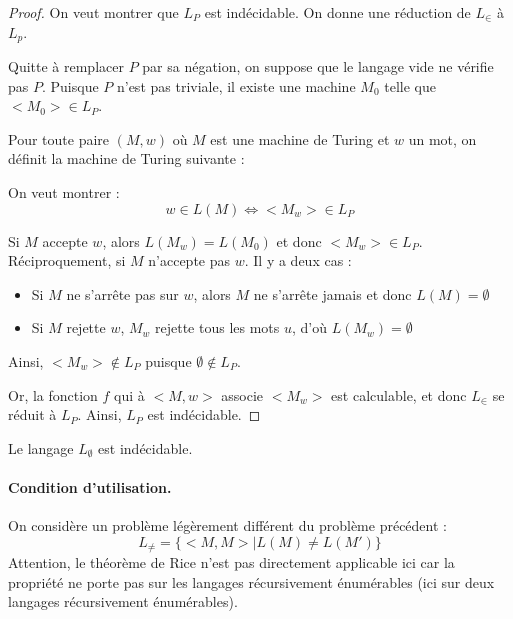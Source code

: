 \begin{proof}
On veut montrer que $L_P$ est indécidable. On donne une réduction de $L_\in$ à $L_p$.

Quitte à remplacer $P$ par sa négation, on suppose que le langage vide ne vérifie pas $P$. Puisque $P$ n'est pas triviale, il existe une machine $M_0$ telle que $<M_0>\in L_P$.


Pour toute paire $(M,w)$ où $M$ est une machine de Turing et $w$ un mot, on définit la machine de Turing suivante :\newline


\newline

On veut montrer :
$$
w\in L(M) \Leftrightarrow <M_w>\in L_P
$$

Si $M$ accepte $w$, alors $L(M_w)=L(M_0)$ et donc $<M_w> \in L_P$. Réciproquement, si $M$ n'accepte pas $w$. Il y a deux cas : 
\begin{itemize}
\item Si $M$ ne s'arrête pas sur $w$, alors $M$ ne s'arrête jamais et donc $L(M)=\emptyset$
\item Si $M$ rejette $w$, $M_w$ rejette tous les mots $u$, d'où $L(M_w)=\emptyset$
\end{itemize}
Ainsi, $<M_w> \notin L_P$ puisque $\emptyset \notin L_P$.



Or, la fonction $f$ qui à $<M,w>$ associe $<M_w>$ est calculable, et donc $L_\in$ se réduit à $L_P$. Ainsi, $L_P$ est indécidable.
\end{proof}

\begin{corollary}
Le langage $L_\emptyset$ est indécidable.
\end{corollary}

\paragraph{Condition d'utilisation.} On considère un problème légèrement différent du problème précédent :
$$
L_{\neq} =\{<M,M> | L(M) \neq L(M')\}
$$
Attention, le théorème de Rice n'est pas directement applicable ici car la propriété ne porte pas sur les langages récursivement énumérables (ici sur deux langages récursivement énumérables).

